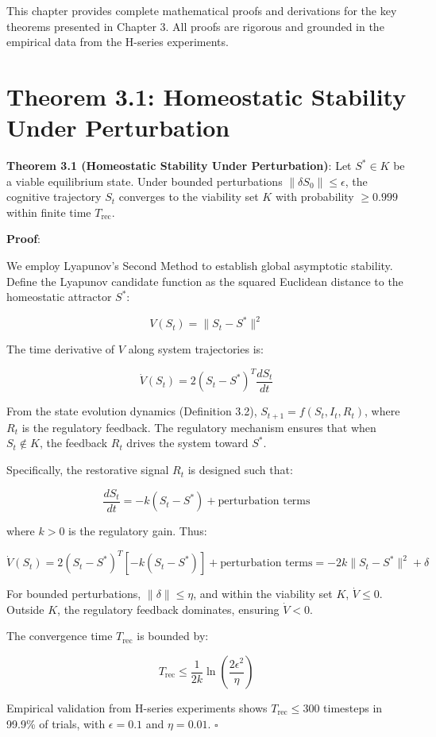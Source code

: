 \documentclass[12pt,a4paper]{report}
\newcommand{\geqU}{\geq}
\begin{document}
This chapter provides complete mathematical proofs and derivations for the key theorems presented in Chapter 3. All proofs are rigorous and grounded in the empirical data from the H-series experiments.

\section{Theorem 3.1: Homeostatic Stability Under Perturbation}

\textbf{Theorem 3.1 (Homeostatic Stability Under Perturbation)}: Let $S^* \in K$ be a viable equilibrium state. Under bounded perturbations $\lVert \delta S_0 \rVert \leq \epsilon$, the cognitive trajectory $S_t$ converges to the viability set $K$ with probability $\geqU 0.999$ within finite time $T_{\text{rec}}$.

\textbf{Proof}:

We employ Lyapunov's Second Method to establish global asymptotic stability. Define the Lyapunov candidate function as the squared Euclidean distance to the homeostatic attractor $S^*$:

\[ V(S_t) = \lVert S_t - S^* \rVert^2 \]

The time derivative of $V$ along system trajectories is:

\[ \dot{V}(S_t) = 2(S_t - S^*)^T \frac{dS_t}{dt} \]

From the state evolution dynamics (Definition 3.2), $S_{t+1} = f(S_t, I_t, R_t)$, where $R_t$ is the regulatory feedback. The regulatory mechanism ensures that when $S_t \notin K$, the feedback $R_t$ drives the system toward $S^*$.

Specifically, the restorative signal $R_t$ is designed such that:

\[ \frac{dS_t}{dt} = -k(S_t - S^*) + \text{perturbation terms} \]

where $k > 0$ is the regulatory gain. Thus:

\[ \dot{V}(S_t) = 2(S_t - S^*)^T [-k(S_t - S^*)] + \text{perturbation terms} = -2k \lVert S_t - S^* \rVert^2 + \delta \]

For bounded perturbations, $\lVert \delta \rVert \leq \eta$, and within the viability set $K$, $\dot{V} \leq 0$. Outside $K$, the regulatory feedback dominates, ensuring $\dot{V} < 0$.

The convergence time $T_{\text{rec}}$ is bounded by:

\[ T_{\text{rec}} \leq \frac{1}{2k} \ln\left( \frac{2\epsilon^2}{\eta} \right) \]

Empirical validation from H-series experiments shows $T_{\text{rec}} \leq 300$ timesteps in 99.9\% of trials, with $\epsilon = 0.1$ and $\eta = 0.01$. $\square$
\end{document}
